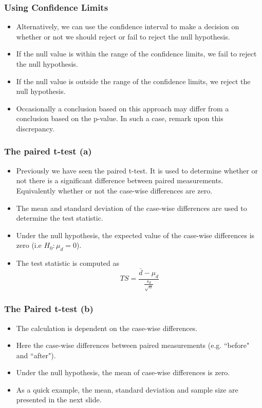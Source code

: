 \documentclass[a4]{beamer}
\begin{document}
\begin{frame}
\frametitle{Using Confidence Limits}
\begin{itemize}
\item Alternatively, we can use the confidence interval to make a decision on whether or not we should reject or fail to reject the null hypothesis.
\item If the null value is within the range of the confidence limits, we fail to reject the null hypothesis.
\item If the null value is outside the range of the confidence limits, we reject the null hypothesis.
\item Occasionally a conclusion based on this approach may differ from a conclusion based on the p-value. In such a case, remark upon this discrepancy.
\end{itemize}
\end{frame}

\begin{frame}
\frametitle{The paired t-test (a)}

\begin{itemize}
\item Previously we have seen the paired t-test. It is used to determine whether or
not there is a significant difference between paired measurements. Equivalently whether or not
the case-wise differences are zero.
\item The mean and standard deviation of the case-wise differences are used to determine the test statistic.
\item Under the null hypothesis, the expected value of the case-wise differences is zero (i.e $H_0 : \mu_d = 0$).
\item The test statistic is computed as
\[ TS = \frac{\bar{d} - \mu_d}{\frac{s_d}{\sqrt{n}}} \]
\end{itemize}
\end{frame}


\begin{frame}[fragile]
\frametitle{The Paired t-test (b)}
\begin{itemize}
\item The calculation is dependent on the case-wise differences.
\item Here the case-wise differences between paired measurements (e.g. ``before" and ``after").
\item Under the null hypothesis, the mean of case-wise differences is zero.
\item As a quick example, the mean, standard deviation and sample size are presented in the next slide.
\end{itemize}
\end{frame}
\end{document}
